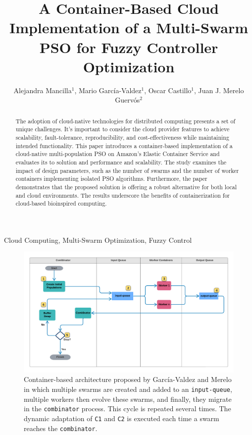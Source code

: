 \documentclass{cys}
\title{A Container-Based Cloud Implementation of a Multi-Swarm PSO for Fuzzy Controller Optimization}
\author{Alejandra Mancilla$^1$, Mario García-Valdez$^1$, Oscar Castillo$^1$, Juan J. Merelo Guerv\'os$^2$}
\affil{ 
$^1$  Tijuana Institute of Technology / Tecnol\'ogico Nacional de M\'exico,   \authorcr   %
Tijuana, Mexico

\authorcr \authorcr
$^2$  University of Granada, Department of Computer Engineering, Automatics and Robotics, \authorcr
Granada, Spain            
\authorcr  \authorcr
\{alejandra.mancilla,mario\}@tectijuana.edu.mx, ocastillo@tectijuana.mx, jmerelo@ugr.es
\authorcr  \authorcr
}
\begin{document}
\maketitle

\renewcommand{\tablename}{Table}

\begin{abstract}

The adoption of cloud-native technologies for distributed computing presents a
set of unique challenges. It's important to consider the cloud provider features
to achieve scalability, fault-tolerance, reproducibility, and cost-effectiveness
while maintaining intended functionality. This paper introduces a
container-based implementation of a cloud-native multi-population PSO on
Amazon's Elastic Container Service and evaluates its to solution and performance and
scalability. The study examines the impact of design parameters, such as
the number of swarms and the number of worker containers implementing isolated
PSO algorithms. Furthermore, the paper demonstrates that the proposed solution
is offering a robust alternative for both local and cloud environments. The
results underscore the benefits of containerization for cloud-based bioinspired
computing.

\end{abstract}

\begin{keywords} 
Cloud Computing, Multi-Swarm Optimization, Fuzzy Control
\end{keywords} 

\begin{figure}[ht]
\centering
\includegraphics[width=\textwidth]{KafkEO}
\caption{Container-based architecture proposed by García-Valdez and Merelo \cite{valdez2021container} 
in which multiple swarms are created and
added to an \texttt{input-queue}, multiple workers then evolve these swarms, and finally,
they migrate in the \texttt{combinator} process. This cycle is repeated several times.
The dynamic adaptation of \texttt{C1} and \texttt{C2} is executed each time a swarm reaches the
\texttt{combinator}.}
\label{fig:KafkEO}
\end{figure}
\end{document}
